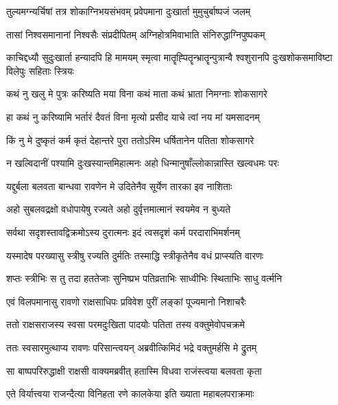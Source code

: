 \twolineshloka
{तुल्यमग्न्यर्चिषां तत्र शोकाग्निभयसंभवम्}
{प्रवेपमाना दुःखार्ता मुमुचुर्बाष्पजं जलम्} %

\twolineshloka
{तासां निश्वसमानानां निश्वसैः संप्रदीपितम्}
{अग्निहोत्रमिवाभाति संनिरुद्धाग्निपुष्पकम्} %

\threelineshloka
{काचिद्दध्यौ सुदुःखार्ता हन्यादपि हि मामयम्}
{स्मृत्वा मातॄह्पितॄन्भ्रातॄन्पुत्रान्वै श्वशुरानपि}
{दुःखशोकसमाविष्टा विलेपुः सहिताः स्त्रियः} %

\twolineshloka
{कथं नु खलु मे पुत्रः करिष्यति मया विना}
{कथं माता कथं भ्राता निमग्नाः शोकसागरे} %

\twolineshloka
{हा कथं नु करिष्यामि भर्तारं दैवतं विना}
{मृत्यो प्रसीद याचे त्वां नय मां यमसादनम्} %

\twolineshloka
{किं नु मे दुष्कृतं कर्म कृतं देहान्तरे पुरा}
{ततोऽस्मि धर्षितानेन पतिता शोकसागरे} %

\twolineshloka
{न खल्विदानीं पश्यामि दुःखस्यान्तमिहात्मनः}
{अहो धिन्मानुषाँल्लोकान्नास्ति खल्वधमः परः} %

\twolineshloka
{यद्दुर्बला बलवता बान्धवा रावणेन मे}
{उदितेनैव सूर्येण तारका इव नाशिताः} %

\twolineshloka
{अहो सुबलवद्रक्षो वधोपायेषु रज्यते}
{अहो दुर्वृत्तमात्मानं स्वयमेव न बुध्यते} %

\twolineshloka
{सर्वथा सदृशस्तावद्विक्रमोऽस्य दुरात्मनः}
{इदं त्वसदृशं कर्म परदाराभिमर्शनम्} %

\twolineshloka
{यस्मादेष परख्यासु स्त्रीषु रज्यति दुर्मतिः}
{तस्माद्धि स्त्रीकृतेनैव वधं प्राप्स्यति वारणः} %

\twolineshloka
{शप्तः स्त्रीभिः स तु तदा हततेजाः सुनिष्प्रभ}
{पतिव्रताभिः साध्वीभिः स्थिताभिः साधु वर्त्मनि} %

\twolineshloka
{एवं विलपमानासु रावणो राक्षसाधिपः}
{प्रविवेश पुरीं लङ्कां पूज्यमानो निशाचरैः} %

\twolineshloka
{ततो राक्षसराजस्य स्वसा परमदुःखिता}
{पादयोः पतिता तस्य वक्तुमेवोपचक्रमे} %

\twolineshloka
{ततः स्वसारमुत्थाप्य रावणः परिसान्त्वयन्}
{अब्रवीत्किमिदं भद्रे वक्तुमर्हसि मे द्रुतम्} %

\twolineshloka
{सा बाष्पपरिरुद्धाक्षी राक्षसी वाक्यमब्रवीत्}
{हतास्मि विधवा राजंस्त्वया बलवता कृता} %

\twolineshloka
{एते विर्यात्त्वया राजन्दैत्या विनिहता रणे}
{कालकेया इति ख्याता महाबलपराक्रमाः} %

